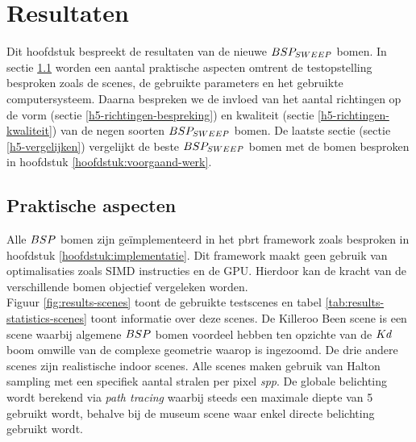 \newcommand\skipCaption[1]{
  \vspace*{-6mm}
  \caption{#1}
}

\newcommand\skipCaptionA[2]{
  \vspace*{-#1mm}
  \caption{#2}
}

\chapter{Resultaten}
\label{hoofdstuk:resultaten}
Dit hoofdstuk bespreekt de resultaten van de nieuwe $BSP_{SWEEP}$ bomen.
In sectie \ref{h5:praktische-aspecten} worden een aantal praktische aspecten omtrent de testopstelling besproken zoals de scenes, de gebruikte parameters en het gebruikte computersysteem.
Daarna bespreken we de invloed van het aantal richtingen op de vorm (sectie \ref{h5-richtingen-bespreking}) en kwaliteit (sectie \ref{h5-richtingen-kwaliteit}) van de negen soorten $BSP_{SWEEP}$ bomen.
De laatste sectie (sectie \ref{h5-vergelijken}) vergelijkt de beste $BSP_{SWEEP}$ bomen met de bomen besproken in hoofdstuk \ref{hoofdstuk:voorgaand-werk}.

\section{Praktische aspecten}
\label{h5:praktische-aspecten}
Alle $BSP$ bomen zijn geïmplementeerd in het pbrt framework zoals besproken in hoofdstuk \ref{hoofdstuk:implementatie}. 
Dit framework maakt geen gebruik van optimalisaties zoals SIMD instructies en de GPU. 
Hierdoor kan de kracht van de verschillende bomen objectief vergeleken worden.\\

Figuur \ref{fig:results-scenes} toont de gebruikte testscenes en tabel \ref{tab:results-statistics-scenes} toont informatie over deze scenes.
De Killeroo Been scene is een scene waarbij algemene $BSP$ bomen voordeel hebben ten opzichte van de $Kd$ boom omwille van de complexe geometrie waarop is ingezoomd.
De drie andere scenes zijn realistische indoor scenes.
Alle scenes maken gebruik van Halton sampling met een specifiek aantal stralen per pixel \textit{spp}.
De globale belichting wordt berekend via \textit{path tracing} waarbij steeds een maximale diepte van 5 gebruikt wordt, behalve bij de museum scene waar enkel directe belichting gebruikt wordt.\\

